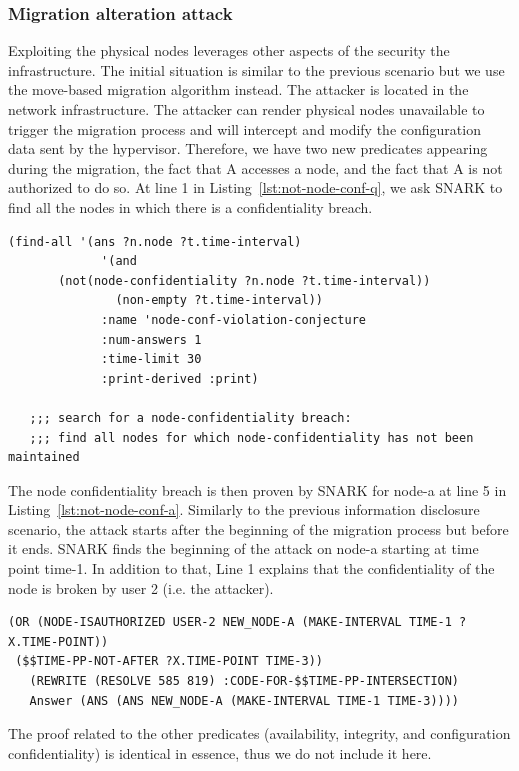 \subsubsection{Migration alteration attack}
Exploiting the physical nodes leverages other aspects of the security the infrastructure.
The initial situation is similar to the previous scenario but we use the move-based migration algorithm instead.
The attacker is located in the network infrastructure.
The attacker can render physical nodes unavailable to trigger the migration process and will intercept and modify the configuration data sent by the hypervisor. 
Therefore, we have two new predicates appearing during the migration, the fact that A accesses a node, and the fact that A is not authorized to do so.
At line 1 in Listing~\ref{lst:not-node-conf-q}, we ask SNARK to find all the nodes in which there is a confidentiality breach.

\begin{lstlisting}[caption=SNARK question to detect the node confidentiality violation., label=lst:not-node-conf-q] 
   (find-all '(ans ?n.node ?t.time-interval)
             '(and
       (not(node-confidentiality ?n.node ?t.time-interval))
               (non-empty ?t.time-interval))
             :name 'node-conf-violation-conjecture
             :num-answers 1
             :time-limit 30
             :print-derived :print)

   ;;; search for a node-confidentiality breach:
   ;;; find all nodes for which node-confidentiality has not been maintained
\end{lstlisting}
The node confidentiality breach is then proven by SNARK for node-a at line 5 in Listing~\ref{lst:not-node-conf-a}.
Similarly to the previous information disclosure scenario, the attack starts after the beginning of the migration process but before it ends.
SNARK finds the beginning of the attack on node-a starting at time point time-1.
In addition to that, Line 1 explains that the confidentiality of the node is broken by user 2 (i.e. the attacker).

\begin{lstlisting}[caption=SNARK detecting the node confidentiality violation., label=lst:not-node-conf-a] 
(OR (NODE-ISAUTHORIZED USER-2 NEW_NODE-A (MAKE-INTERVAL TIME-1 ?X.TIME-POINT))
 ($$TIME-PP-NOT-AFTER ?X.TIME-POINT TIME-3))
   (REWRITE (RESOLVE 585 819) :CODE-FOR-$$TIME-PP-INTERSECTION)
   Answer (ANS (ANS NEW_NODE-A (MAKE-INTERVAL TIME-1 TIME-3)))) 
\end{lstlisting}

The proof related to the other predicates (availability, integrity, and configuration confidentiality) is identical in essence, thus we do not include it here.